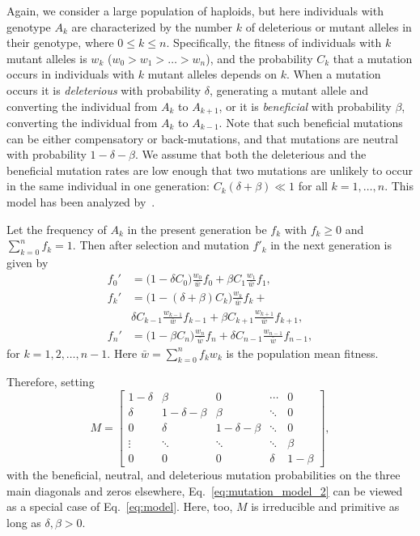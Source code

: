\documentclass[9pt, a4paper, twocolumn]{extarticle}
\begin{document}
Again, we consider a large population of haploids, but here individuals with genotype $A_k$ are characterized by the number $k$ of deleterious or mutant alleles in their genotype, where $0 \le k \le n$.
Specifically, the fitness of individuals with $k$ mutant alleles is $w_k$ ($w_0 > w_1 > \ldots > w_n$),
and the probability $C_k$ that a mutation occurs in individuals with $k$ mutant alleles depends on $k$.
When a mutation occurs it is \emph{deleterious} with probability $\delta$, generating a mutant allele and converting the individual from $A_k$ to $A_{k+1}$,
or it is \emph{beneficial} with probability $\beta$, converting the individual from $A_k$ to $A_{k-1}$.
Note that such beneficial mutations can be either compensatory or back-mutations, and that mutations are neutral with probability $1-\delta-\beta$.
We assume that both the deleterious and the beneficial mutation rates are low enough that two mutations are unlikely to occur in the same individual in one generation: $C_k(\delta + \beta) \ll 1$ for all $k=1, \ldots, n$.
This model has been analyzed by~\citet{Ram2012}.

Let the frequency of $A_k$ in the present generation be $f_k$ with $f_k \ge 0$ and $\sum_{k=0}^{n}{f_k}=1$.
Then after selection and mutation $f'_k$ in the next generation is given by
\begin{equation}
\begin{aligned}
f_0' &= \big(1 - \delta C_0\big) \frac{w_0}{\bar{w}} f_0 + \beta C_{1} \frac{w_{1}}{\bar{w}} f_{1}, \\
f_k' &= \big(1 - (\delta+\beta) C_k\big) \frac{w_k}{\bar{w}} f_k + \\
	 & \delta C_{k-1} \frac{w_{k-1}}{\bar{w}} f_{k-1} + 
	 \beta C_{k+1} \frac{w_{k+1}}{\bar{w}} f_{k+1}, \\
f_n' &= \big(1 - \beta C_n\big) \frac{w_n}{\bar{w}} f_n + \delta C_{n-1} \frac{w_{n-1}}{\bar{w}} f_{n-1},	 
\end{aligned}
\label{eq:mutation_model_2}
\end{equation}
for $k=1,2,\ldots, n-1$.
Here $\bar{w}=\sum_{k=0}^{n}{f_k w_k}$ is the population mean fitness.

Therefore, setting 
\begin{equation}
{M} = \begin{bmatrix}
1-\delta & \beta & 0 &  \cdots & 0\\
\delta & 1-\delta-\beta & \beta &  \ddots & 0\\
0 & \delta & 1-\delta-\beta & \ddots & 0 \\
\vdots & \ddots & \ddots & \ddots & \beta \\
0 & 0 & 0 & \delta & 1-\beta
\end{bmatrix},
\end{equation}
with the beneficial, neutral, and deleterious mutation probabilities on the three main diagonals and zeros elsewhere, 
Eq.~\ref{eq:mutation_model_2} can be viewed as a special case of Eq.~\ref{eq:model}.
Here, too, ${M}$ is irreducible and primitive as long as $\delta, \beta > 0$.
\end{document}

